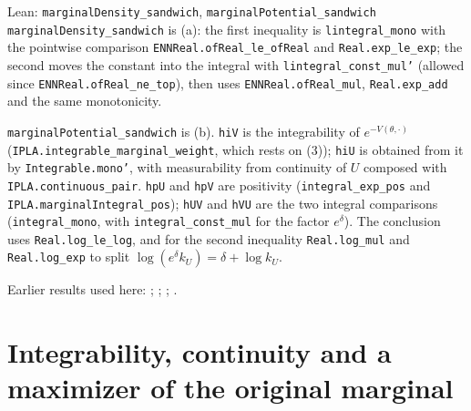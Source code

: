 \documentclass[11pt,a4paper]{article}
\begin{document}
\begin{leanbox}{Lean: \texttt{marginalDensity\_\allowbreak{}sandwich}, \texttt{marginalPotential\_\allowbreak{}sandwich}}
\texttt{marginal\allowbreak{}Density\_\allowbreak{}sandwich} is (a): the first inequality is \texttt{lintegral\_\allowbreak{}mono} with the pointwise comparison \texttt{ENNReal.\allowbreak{}of\allowbreak{}Real\_\allowbreak{}le\_\allowbreak{}of\allowbreak{}Real} and \texttt{Real.\allowbreak{}exp\_\allowbreak{}le\_\allowbreak{}exp}; the second moves the constant into the integral with \texttt{lintegral\_\allowbreak{}const\_\allowbreak{}mul'} (allowed since \texttt{ENNReal.\allowbreak{}of\allowbreak{}Real\_\allowbreak{}ne\_\allowbreak{}top}), then uses \texttt{ENNReal.\allowbreak{}of\allowbreak{}Real\_\allowbreak{}mul}, \texttt{Real.\allowbreak{}exp\_\allowbreak{}add} and the same monotonicity.




\texttt{marginal\allowbreak{}Potential\_\allowbreak{}sandwich} is (b). \texttt{hi\allowbreak{}V} is the integrability of \(e^{-V(\theta,\cdot)}\) (\texttt{IPLA.\allowbreak{}integrable\_\allowbreak{}marginal\_\allowbreak{}weight}, which rests on (3)); \texttt{hi\allowbreak{}U} is obtained from it by \texttt{Integrable.\allowbreak{}mono'}, with measurability from continuity of \(U\) composed with \texttt{IPLA.\allowbreak{}continuous\_\allowbreak{}pair}. \texttt{hp\allowbreak{}U} and \texttt{hp\allowbreak{}V} are positivity (\texttt{integral\_\allowbreak{}exp\_\allowbreak{}pos} and \texttt{IPLA.\allowbreak{}marginal\allowbreak{}Integral\_\allowbreak{}pos}); \texttt{h\allowbreak{}UV} and \texttt{h\allowbreak{}VU} are the two integral comparisons (\texttt{integral\_\allowbreak{}mono}, with \texttt{integral\_\allowbreak{}const\_\allowbreak{}mul} for the factor \(e^\delta\)). The conclusion uses \texttt{Real.\allowbreak{}log\_\allowbreak{}le\_\allowbreak{}log}, and for the second inequality \texttt{Real.\allowbreak{}log\_\allowbreak{}mul} and \texttt{Real.\allowbreak{}log\_\allowbreak{}exp} to split \(\log(e^\delta k_U)=\delta+\log k_U\).
\end{leanbox}


Earlier results used here: \cite[Section~3.1.1]{LangevinLean2026IPLA}; \cite[Section~3.12.1]{LangevinLean2026IPLA}; \cite[Section~3.3.1]{LangevinLean2026IPLA}; \cite[Section~3.9.2]{LangevinLean2026IPLA}.

\section{\texorpdfstring{Integrability, continuity and a maximizer of the original marginal}{Integrability, continuity and a maximizer of the original marginal}}
\end{document}
